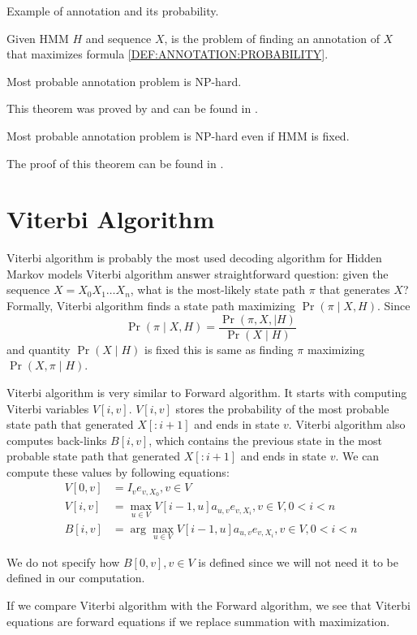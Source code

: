 \begin{example}
Example of annotation and its probability.
\end{example}

\begin{definition}
Given HMM $H$ and sequence $X$,  is the problem of finding an annotation of $X$ that maximizes
formula \ref{DEF:ANNOTATION:PROBABILITY}.
\end{definition}

\begin{theorem}
Most probable annotation problem is NP-hard.
\end{theorem}
This theorem was proved by \cite{} and can be found in \cite{}.

\begin{theorem}
Most probable annotation problem is NP-hard even if HMM is fixed.
\end{theorem}
The proof of this theorem can be found in \cite{}.


\section{Viterbi Algorithm}
Viterbi algorithm is probably the most used decoding algorithm for Hidden Markov
models
Viterbi algorithm answer straightforward question: given the sequence
$X=X_0X_1\dots X_n$, what
is the most-likely state path $\pi$ that generates $X$? Formally, Viterbi
algorithm finds a state path maximizing $\Pr\left( \pi\mid X,H \right)$. Since
\[\Pr\left(\pi\mid X,H\right) = \frac{\Pr\left(\pi,X,\mid
H\right)}{\Pr\left(X\mid H\right)}\] and quantity $\Pr\left(X\mid H\right)$ is fixed
this is same as finding $\pi$ maximizing $\Pr\left(X,\pi\mid H\right)$. 

Viterbi algorithm is very similar to Forward algorithm. It starts with computing
Viterbi variables $V[i,v]$. $V[i,v]$ stores the probability of the most probable 
state path that generated $X[:i+1]$ and ends in state $v$. Viterbi algorithm
also computes back-links $B[i,v]$, which contains the previous state in the most
probable state path that generated $X[:i+1]$ and ends in state $v$. We can
compute these values by following equations:
\begin{align}
V[0,v] &= I_{v}e_{v,X_0}, v\in V\\
V[i,v] &= \max_{u\in V} V[i-1,u]a_{u,v}e_{v,X_i}, v\in V,0<i<n\\
B[i,v] &= \arg\max_{u\in V} V[i-1,u]a_{u,v}e_{v,X_i}, v\in V,0<i<n
\end{align}
\begin{note}
We do not specify how $B[0,v],v\in V$ is defined since we will not
need it to be defined in our computation.
\end{note}
\begin{note}
If we compare Viterbi algorithm with the Forward algorithm, we see that
Viterbi equations are forward equations if we replace summation with
maximization.
\end{note}

